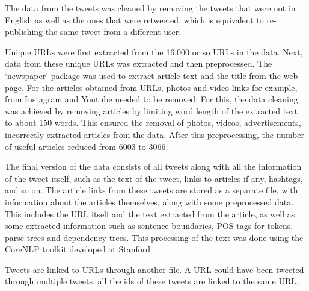 The data from the tweets was cleaned by removing the tweets that were not in English as well as the ones that were retweeted, which is equivalent to re-publishing the same tweet from a different user. 

Unique URLs were first extracted from the 16,000 or so URLs in the data. Next, data from these unique URLs was extracted and then preprocessed. The ‘newspaper’ package was used to extract article text and the title from the web page. For the articles obtained from URLs, photos and video links for example, from Instagram and Youtube needed to be removed. For this, the data cleaning was achieved by removing articles by limiting word length of the extracted text to about 150 words. This ensured the removal of photos, videos, advertisements, incorrectly extracted articles from the data.  After this preprocessing, the number of useful articles reduced from 6003 to 3066.

The final version of the data consists of all tweets along with all the information of the tweet itself, such as the text of the tweet, links to articles if any, hashtags, and so on. The article links from these tweets are stored as a separate file, with information about the articles themselves, along with some preprocessed data. This includes the URL itself and the text extracted from the article, as well as some extracted information such as sentence boundaries, POS tags for tokens, parse trees and dependency trees. This processing of the text was done using the CoreNLP toolkit developed at Stanford .

Tweets are linked to URLs through another file. A URL could have been tweeted through multiple tweets, all the ids of these tweets are linked to the same URL. 